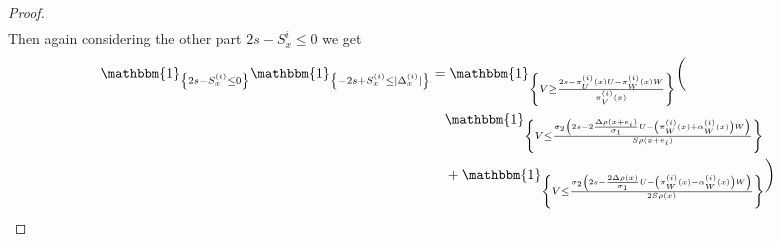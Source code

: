\documentclass[12pt]{article}
\theoremstyle{Theorem}
\begin{document}
\begin{proof}
{\begin{align*}
\end{align*}}
Then again considering the other part $2s - S^{i}_{\scriptscriptstyle x} \leq 0$ we get 
{\small
\begin{align*}
\mathbbm{1}_{\left\{ 2s - S^{\scriptscriptstyle (i)}_{\scriptscriptstyle x} \leq 0 \right\}}\mathbbm{1}_{\left\{ -2s + S^{\scriptscriptstyle (i)}_{\scriptscriptstyle x} \leq |\Delta^{\scriptscriptstyle (i)}_ {\scriptscriptstyle x}|\right\}} & = \mathbbm{1}_{\left\{ V \geq \frac{2s -   \pi^{\scriptscriptstyle (i)}_{U}(x)U - \pi^{\scriptscriptstyle (i)}_{W}(x)W}{\pi^{\scriptscriptstyle (i)}_{V}(x)}\right\}} \bigg( \\
& \hspace{0.35cm}   \mathbbm{1}_{\left\{ V \leq \frac{\sigma_{2}\left(2s - 2\frac{\Delta\rho(x+e_i)}{\sigma_1}U -  \left(\pi^{\scriptscriptstyle (i)}_{W}(x) + \alpha^{\scriptscriptstyle (i)}_{W}(x)\right)W\right)}{S\rho(x+e_i)} \right\}}  \\
& \hspace{0.35cm}  + \mathbbm{1}_{\left\{ V \leq \frac{\sigma_{2}\left(2s -\frac{2\Delta\rho(x)}{\sigma_1}U - \left(\pi^{\scriptscriptstyle (i)}_{W}(x) - \alpha^{\scriptscriptstyle (i)}_{W}(x)\right)W\right)}{2S\rho(x)}\right\}}\bigg)  
\end{align*}}


\end{proof}
\end{document}
